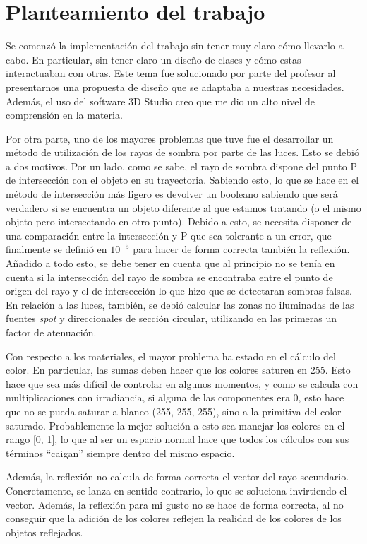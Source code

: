 \documentclass[a4paper,11pt,final]{scrartcl}
\begin{document}
\section{Planteamiento del trabajo}
Se comenzó la implementación del trabajo sin tener muy claro cómo llevarlo a cabo. En particular, sin tener claro un diseño de clases y cómo estas interactuaban con otras. Este tema fue solucionado por parte del profesor al presentarnos una propuesta de diseño que se adaptaba a nuestras necesidades. Además, el uso del software 3D Studio creo que me dio un alto nivel de comprensión en la materia.

Por otra parte, uno de los mayores problemas que tuve fue el desarrollar un método de utilización de los rayos de sombra por parte de las luces. Esto se debió a dos motivos. Por un lado, como se sabe, el rayo de sombra dispone del punto P de intersección con el objeto en su trayectoria. Sabiendo esto, lo que se hace en el método de intersección más ligero es devolver un booleano sabiendo que será verdadero si se encuentra un objeto diferente al que estamos tratando (o el mismo objeto pero intersectando en otro punto). Debido a esto, se necesita disponer de una comparación entre la intersección y P que sea tolerante a un error, que finalmente se definió en $10^{-5}$ para hacer de forma correcta también la reflexión. Añadido a todo esto, se debe tener en cuenta que al principio no se tenía en cuenta si la intersección del rayo de sombra se encontraba entre el punto de origen del rayo y el de intersección lo que hizo que se detectaran sombras falsas. En relación a las luces, también, se debió calcular las zonas no iluminadas de las fuentes {\em spot} y direccionales de sección circular, utilizando en las primeras un factor de atenuación.

Con respecto a los materiales, el mayor problema ha estado en el cálculo del color. En particular, las sumas deben hacer que los colores saturen en 255. Esto hace que sea más difícil de controlar en algunos momentos, y como se calcula con multiplicaciones con irradiancia, si alguna de las componentes era 0, esto hace que no se pueda saturar a blanco (255, 255, 255), sino a la primitiva del color saturado. Probablemente la mejor solución a esto sea manejar los colores en el rango [0, 1], lo que al ser un espacio normal hace que todos los cálculos con sus términos ``caigan'' siempre dentro del mismo espacio.

Además, la reflexión no calcula de forma correcta el vector del rayo secundario. Concretamente, se lanza en sentido contrario, lo que se soluciona invirtiendo el vector. Además, la reflexión para mi gusto no se hace de forma correcta, al no conseguir que la adición de los colores reflejen la realidad de los colores de los objetos reflejados.
\end{document}
